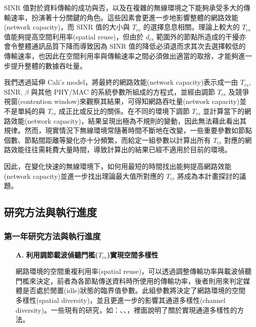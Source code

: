 \documentclass[12pt,a4paper]{article}
\begin{document}
\begin{description}
SINR 值對於資料傳輸的成功與否，以及在複雜的無線環境之下能夠承受多大的傳輸速率，扮演著十分關鍵的角色。這些因素會更進一步地影響整體的網路效能(network capacity)，而 SINR 值的大小與 $T_{cs}$ 的選擇息息相關。理論上較大的 $T_{cs}$ 值能夠提高空間利用率(spatial reuse)，但由於 $d_{cs}$ 範圍外的節點所造成的干擾亦會令整體通訊品質下降而導致因為 SINR 值的降低必須退而求其次去選擇較低的傳輸速率，也因此在空間利用率與傳輸速率之間必須做出適當的取捨，才能夠進一步提升整體的數據吞吐量。 

我們透過延伸 Cali’s  model\cite{tn00_cali}，將最終的網路效能(network capacity)表示成一由 $T_{cs}$, SINR, $\beta$ 與其他 PHY/MAC 的系統參數所組成的方程式，並經由調節 $T_{cs}$ 及競爭視窗(contention window)來觀察其結果，可得知網路吞吐量(network capacity)並不是單純的與 $T_{cs}$ 成正比或反比的關係。在不同的環境下調節 $T_{cs}$ 並計算當下的網路效能(network capacity)，結果呈現出極為不規則的變動，因此無法藉此看出其規律。然而，現實情況下無線環境常隨著時間不斷地在改變，一些重要參數如節點個數、節點間距離等變化亦十分頻繁，而給定一組參數以計算出所有 $T_{cs}$ 對應的網路效能往往需耗費大量時間，導致計算出的結果已經不適用於目前的環境。 

因此，在變化快速的無線環境下，如何用最短的時間找出能夠提高網路效能(network capacity)並進一步找出理論最大值所對應的 $T_{cs}$ 將成為本計畫探討的議題。\\

\subsection{研究方法與執行進度}
\subsubsection{第一年研究方法與執行進度}

\begin{enumerate}
\setlength\parindent{2em}    %
\item [\bf A.]{\textbf{\Kai 利用調節載波偵聽門檻($T_{cs}$)實現空間多樣性 }}\\
\vspace{-2mm}

網路環境的空間重複利用率(spatial reuse)，可以透過調整傳輸功率與載波偵聽門檻來決定，前者為各節點傳送資料時所使用的傳輸功率，後者則用來判定媒體是否處於閒置(idle)狀態的臨界值參數。此組參數將決定了網路環境的空間多樣性(spatial diversity)，並且更進一步的影響其通道多樣性(channel diversity)。一些現有的研究，如：\cite{ccr2004_rws}、\cite{mobicom04_ssch}、\cite{mobihoc04_mcmac}，裡面說明了關於實現通道多樣性的方法。


\end{enumerate}
\end{description}
\end{document}
